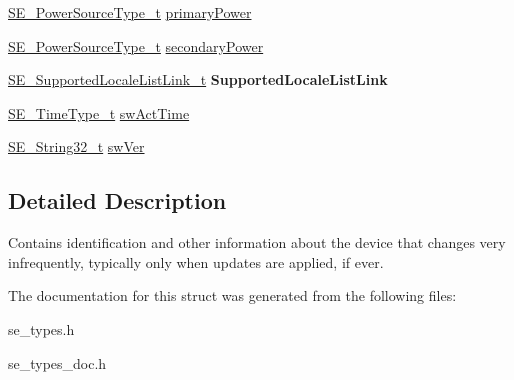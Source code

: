 \begin{DoxyCompactItemize}
\item 
\hyperlink{group__PowerSourceType_ga196e6e180c5421a97062704daa6a96fc}{S\+E\+\_\+\+Power\+Source\+Type\+\_\+t} \hyperlink{group__DeviceInformation_ga8a5e0fea94c0beb11adc08bb48e24727}{primary\+Power}
\item 
\hyperlink{group__PowerSourceType_ga196e6e180c5421a97062704daa6a96fc}{S\+E\+\_\+\+Power\+Source\+Type\+\_\+t} \hyperlink{group__DeviceInformation_ga14b35fc277040acdf2c3964cff35e518}{secondary\+Power}
\item 
\hyperlink{structSE__SupportedLocaleListLink__t}{S\+E\+\_\+\+Supported\+Locale\+List\+Link\+\_\+t} {\bfseries Supported\+Locale\+List\+Link}
\item 
\hyperlink{group__TimeType_ga6fba87a5b57829b4ff3f0e7638156682}{S\+E\+\_\+\+Time\+Type\+\_\+t} \hyperlink{group__DeviceInformation_gaf5c095448352c4991118c909f8eee40e}{sw\+Act\+Time}
\item 
\hyperlink{group__String32_gac9f59b06b168b4d2e0d45ed41699af42}{S\+E\+\_\+\+String32\+\_\+t} \hyperlink{group__DeviceInformation_ga1291b6f479ed99ca846ffd34beb6c3c0}{sw\+Ver}
\end{DoxyCompactItemize}


\subsection{Detailed Description}
Contains identification and other information about the device that changes very infrequently, typically only when updates are applied, if ever. 

The documentation for this struct was generated from the following files\+:\begin{DoxyCompactItemize}
\item 
se\+\_\+types.\+h\item 
se\+\_\+types\+\_\+doc.\+h\end{DoxyCompactItemize}
